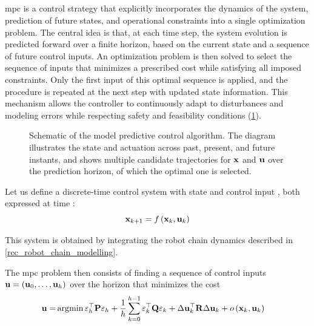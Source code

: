 \subsection{}
\label{rcc_c_model_predictive_control}

\Acl{mpc} is a control strategy that explicitly incorporates the dynamics of
the system, prediction of future states, and operational constraints into a single optimization
problem. The central idea is that, at each time step, the system evolution is predicted forward
over a finite horizon, based on the current state and a sequence of future control inputs. An
optimization problem is then solved to select the sequence of inputs that minimizes a prescribed
cost while satisfying all imposed constraints. Only the first input of this optimal sequence is
applied, and the procedure is repeated at the next step with updated state information. This
mechanism allows the controller to continuously adapt to disturbances and modeling errors while
respecting safety and feasibility conditions (\cref{rcc_c_mpc_schematic}).

\begin{figure}
	\centering
	\caption{Schematic of the model predictive control algorithm. The diagram illustrates the state
		and actuation across past, present, and future instants, and shows multiple candidate trajectories
		for $\vect{x}$ and $\vect{u}$ over the prediction horizon, of which the optimal one is selected.}
	\label{rcc_c_mpc_schematic}
\end{figure}

Let us define a discrete-time control system with state  and control input
, both expressed at time :
\begin{equation}
	\ldvect{x}{k+1} = f\left(\ldvect{x}{k}, \ldvect{u}{k}\right)
	\label{mcc_c_mpc_system}
\end{equation}

This system is obtained by integrating the robot chain dynamics described in
\cref{rcc_robot_chain_modelling}.

The \ac{mpc} problem then consists of finding a sequence of control inputs
$\vect{u}=\left(\ldvect{u}{0}, \dots, \ldvect{u}{h}\right)$ over the horizon \mpch{} that minimizes
the cost
\begin{align}
	\vect{u} = & \argmin{\lures{h}{\top} \matr{P} \res{h}
	+ \frac{1}{\mpch{}}\sum_{k=0}^{\mpch{}-1}{\lures{k}{\top} \matr{Q} \res{k}
	+ \Delta \llvect{u}{\top}{k} \matr{R} \Delta \ldvect{u}{k} + o\left(\ldvect{x}{k}, \ldvect{u}{k}\right)}}
	\label{rcc_c_mpc_equation}
\end{align}

